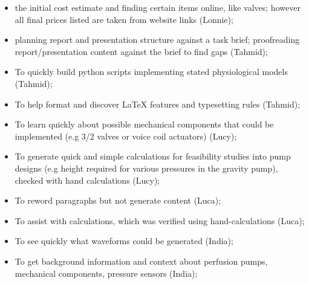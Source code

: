 \documentclass[10pt, a4paper]{article}
\begin{document}
\begin{itemize}[noitemsep]
    \item the initial cost estimate and finding certain items online, like valves; however all final prices listed are taken from website links (Lonnie);
    \item planning report and presentation structure against a task brief; proofreading report/presentation content against the brief to find gaps (Tahmid);
    \item To quickly build python scripts implementing stated physiological models (Tahmid);
    \item To help format and discover \LaTeX{} features and typesetting rules (Tahmid);
    \item To learn quickly about possible mechanical components that could be implemented (e.g 3/2 valves or voice coil actuators) (Lucy);
    \item To generate quick and simple calculations for feasibility studies into pump designs (e.g height required for various pressures in the gravity pump), checked with hand calculations (Lucy);
    \item To reword paragraphs but not generate content (Luca);
    \item To assist with calculations, which was verified using hand-calculations (Luca);
    \item To see quickly what waveforms could be generated (India);
    \item To get background information and context about perfusion pumps, mechanical components, pressure sensors (India);
\end{itemize}





\appendix
\end{document}

